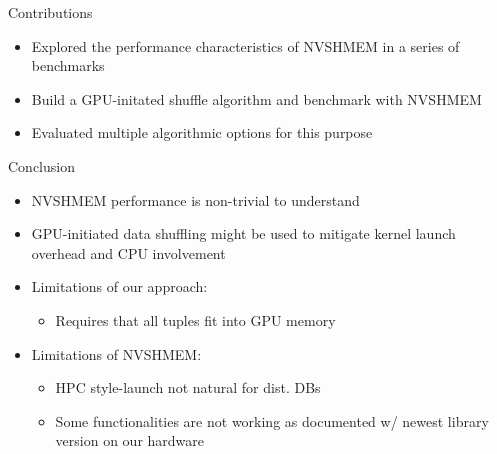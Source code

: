 \documentclass[
	ngerman,%
	aspectratio=169,%
	color={accentcolor=8c},
	logo=true,%
	colorframetitle=true,%
    authorontitle=true,
	]{tudabeamer}
\begin{document}
\begin{frame}{Contributions}

\begin{itemize}
    \item Explored the performance characteristics of NVSHMEM in a series of benchmarks
    \item Build a GPU-initated shuffle algorithm and benchmark with NVSHMEM
    \item Evaluated multiple algorithmic options for this purpose
\end{itemize}
   
\end{frame}


\begin{frame}{Conclusion}

\begin{itemize}
    \item NVSHMEM performance is non-trivial to understand
    \item GPU-initiated data shuffling might be used to mitigate kernel launch overhead and CPU involvement 
    \item Limitations of our approach:\\
    \begin{itemize}
        \item Requires that all tuples fit into GPU memory
    \end{itemize}
    \item Limitations of NVSHMEM:\\
    \begin{itemize}
        \item HPC style-launch not natural for dist. DBs
        \item Some functionalities are not working as documented w/ newest library version on our hardware
    \end{itemize}
\end{itemize}
   
\end{frame}
\end{document}

